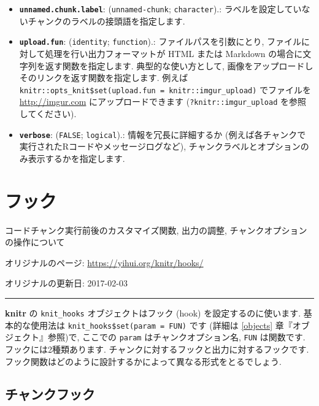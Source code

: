 \documentclass[
  lualatex,ja=standard,jafont=noto-otf]{bxjsreport}
\begin{document}
\begin{itemize}
{    では出力フォーマット関数に同様のオプションが用意されていることが多いです}.
\item
  \textbf{\texttt{unnamed.chunk.label}}: (\texttt{unnamed-chunk};
  \texttt{character}).:
  ラベルを設定していないチャンクのラベルの接頭語を指定します.
\item
  \textbf{\texttt{upload.fun}}: (\texttt{identity}; \texttt{function}).:
  ファイルパスを引数にとり, ファイルに対して処理を行い出力フォーマットが
  HTML または Markdown の場合に文字列を返す関数を指定します.
  典型的な使い方として,
  画像をアップロードしそのリンクを返す関数を指定します. 例えば
  \texttt{knitr::opts\_knit\$set(upload.fun\ =\ knitr::imgur\_upload)}
  でファイルを \url{http://imgur.com} にアップロードできます
  (\texttt{?knitr::imgur\_upload} を参照してください).
\item
  \textbf{\texttt{verbose}}: (\texttt{FALSE}; \texttt{logical}).:
  情報を冗長に詳細するか
  (例えば各チャンクで実行されたRコードやメッセージログなど),
  チャンクラベルとオプションのみ表示するかを指定します.
\end{itemize}

\hypertarget{hooks}{%
\chapter{フック}\label{hooks}}

コードチャンク実行前後のカスタマイズ関数, 出力の調整,
チャンクオプションの操作について

オリジナルのページ: \url{https://yihui.org/knitr/hooks/}

オリジナルの更新日: 2017-02-03

\begin{center}\rule{0.5\linewidth}{0.5pt}\end{center}

\textbf{knitr} の \texttt{knit\_hooks} オブジェクトはフック (hook)
を設定するのに使います. 基本的な使用法は
\texttt{knit\_hooks\$set(param\ =\ FUN)} です (詳細は \ref{objects}
章『オブジェクト』参照)で, ここでの \texttt{param}
はチャンクオプション名, \texttt{FUN} は関数です.
フックには2種類あります. チャンクに対するフックと出力に対するフックです.
フック関数はどのように設計するかによって異なる形式をとるでしょう.

\hypertarget{ux30c1ux30e3ux30f3ux30afux30d5ux30c3ux30af}{%
\section{チャンクフック}\label{ux30c1ux30e3ux30f3ux30afux30d5ux30c3ux30af}}
\end{document}
